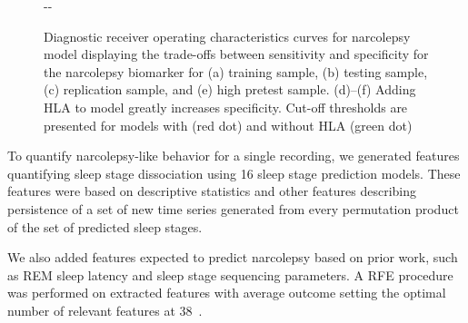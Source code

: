 \begin{figure}[htbp]
\begin{adjustwidth*}{}{-\marginparwidth-\marginparsep}
    \caption[Diagnostic receiver operating characteristics curves for narcolepsy model]{Diagnostic receiver operating characteristics curves for narcolepsy model displaying the trade-offs between sensitivity and specificity for the narcolepsy biomarker for (a) training sample, (b) testing sample, (c) replication sample, and (e) high pretest sample. 
    (d)–(f) Adding \ac{HLA} to model greatly increases specificity. 
    Cut-off thresholds are presented for models with (red dot) and without \ac{HLA} (green dot)}
    \label{fig:classification-sleep-disorders:paper-iii:figure-04}
    \end{adjustwidth*}
\end{figure}

To quantify narcolepsy-like behavior for a single recording, we generated features quantifying sleep stage dissociation using 16 sleep stage prediction models. 
These features were based on descriptive statistics and other features describing persistence of a set of new time series generated from every permutation product of the set of predicted sleep stages.

We also added features expected to predict narcolepsy based on prior work, such as \ac{REM} sleep latency and sleep stage sequencing parameters. 
A \ac{RFE} procedure was performed on extracted features with average outcome setting the optimal number of relevant features at 38~\cite{Guyon2002}. 

